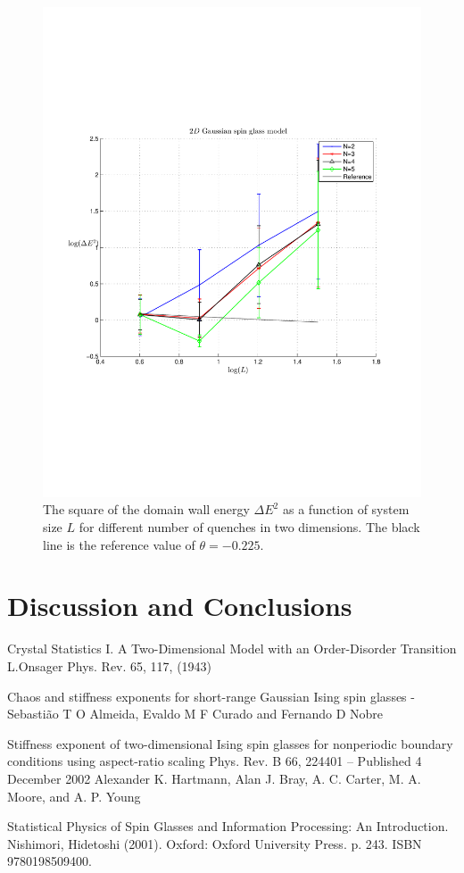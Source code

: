 \documentclass[paper=a4, fontsize=11pt]{scrartcl} %
\numberwithin{equation}{section} %
\numberwithin{figure}{section} %
\numberwithin{table}{section} %
\begin{document}
\begin{figure}[hbtp]
\centering
\includegraphics[width=\textwidth]{spinglass3D.pdf}
\caption{The square of the domain wall energy $\Delta E ^ 2$ as a function of system size $L$ for different number of quenches in two dimensions. The black line is the reference value of $\theta=-0.225$.}
\label{fig:E_3D}
\end{figure}

\section{Discussion and Conclusions}
\label{sec:discussion}

\begin{thebibliography}{100}

Crystal Statistics I. A Two-Dimensional Model with an Order-Disorder Transition
L.Onsager
Phys. Rev. 65, 117, (1943)

Chaos and stiffness exponents for short-range Gaussian Ising spin glasses - Sebasti\~{a}o T O Almeida, Evaldo M F Curado and
Fernando D Nobre

Stiffness exponent of two-dimensional Ising spin glasses for nonperiodic boundary conditions using aspect-ratio scaling
Phys. Rev. B 66, 224401 – Published 4 December 2002
Alexander K. Hartmann, Alan J. Bray, A. C. Carter, M. A. Moore, and A. P. Young

Statistical Physics of Spin Glasses and Information Processing: An Introduction. 
Nishimori, Hidetoshi (2001). 
Oxford: Oxford University Press. p. 243. ISBN 9780198509400.

\end{thebibliography}
\end{document}
